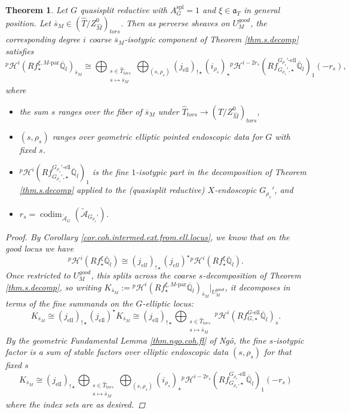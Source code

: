 \documentclass[openany]{amsbook}
\newtheorem{theorem}{Theorem}[chapter]
\theoremstyle{definition}
\theoremstyle{remark}
\numberwithin{equation}{section}
\newcommand{\Q}{\mathbb{Q}}
\newcommand{\cA}{\mathcal{A}}
\newcommand{\ol}[1]{\overline{#1}}
\renewcommand{\-}{\operatorname{-}}
\renewcommand{\a}{\mathfrak{a}}
\newcommand{\on}[1]{\operatorname{#1}}
\newcommand{\pHi}{{}^p \mathcal{H}^i}
\newcommand{\pHishift}{{}^p \mathcal{H}^{i - 2r_s}}
\newcommand{\good}{\mathit{good}}
\newcommand{\el}{\text{-ell}}
\newcommand{\ctA}{\widetilde{\cA}}
\newcommand{\spl}{\mathrm{spl}}
\newcommand{\Mpar}{M\text{-par}}
\newcommand{\tors}{\mathit{tors}}
\newcommand{\codim}{\on{codim}}
\begin{document}
\begin{theorem}\label{thm.coh.stab.geo}
    Let $G$ quasisplit reductive with $A_G^{\spl} = 1$ and $\xi \in \a_T$ in general position. Let $\ol{s}_M \in (\widehat{T}/Z^0_{\widehat{M}})_{\tors}$. Then as perverse sheaves on $U_M^{\good}$, the corresponding degree $i$ coarse $\ol{s}_M$-isotypic component of Theorem \ref{thm.s.decomp} satisfies
    $$
        \pHi(R f_\star^{\xi, \Mpar} \ol{\Q}_l)_{\ol{s}_M} \cong \bigoplus_{\substack{s \in \widehat{T}_{\tors} \\ s \mapsto \ol{s}_M}} \bigoplus_{(s, \rho_{s})} (j_{\on{ell}})_{!\star} (i_{\rho_{s}})_\star \pHishift(R f_{G_{\rho_s}',\star}^{G_{\rho_s}'\el} \ol{\Q}_l)_1(-r_s),
    $$
    where
    \begin{itemize} 
    \item the sum $s$ ranges over the fiber of $\ol{s}_M$ under $\widehat{T}_{\tors} \to (\widehat{T}/Z^0_{\widehat{M}})_{\tors}$,
    \item $(s,\rho_{s})$ ranges over geometric elliptic pointed endoscopic data for $G$ with fixed $s$.
    \item $\pHi(R f_{G_{\rho_s}',\star}^{G_{\rho_s}'\el} \ol{\Q}_l)_1$ is the fine $1$-isotypic part in the decomposition of Theorem \ref{thm.s.decomp} applied to the (quasisplit reductive) $X$-endoscopic $G_{\rho_s}'$, and
    \item $r_s = \codim_{\ctA_G}(\ctA_{G_{\rho_s}'})$.
    \end{itemize}
\begin{proof}
    By Corollary \ref{cor.coh.intermed.ext.from.ell.locus}, we know that on the good locus we have 
    $$
        \pHi(R f_\star^{\xi} \ol{\Q}_l) \cong (j_{ell})_{!\star} (j_{ell})^\star \pHi(R f_\star^{\xi} \ol{\Q}_l). 
    $$
    Once restricted to $U_M^{\good}$, this splits across the coarse $s$-decomposition of Theorem \ref{thm.s.decomp}, so writing $K_{\ol{s}_M} := \pHi(R f_\star^{\xi, \Mpar} \ol{\Q}_l)_{\ol{s}_M}|_{U_M^{\good}}$, it decomposes in terms of the \emph{fine} summands on the $G$-elliptic locus:
    $$
        K_{\ol{s}_M} \cong (j_{\on{ell}})_{!\star} (j_{\on{ell}})^\star K_{\ol{s}_M} \cong (j_{\on{ell}})_{!\star} \bigoplus_{\substack{s \in \widehat{T}_{\tors} \\ s \mapsto \ol{s}_M}} \pHi(R f^{G\el}_{G, \star} \ol{\Q}_l)_{s}.
    $$
    By the geometric Fundamental Lemma \ref{thm.ngo.coh.fl}  of Ng\^{o}, the fine $s$-isotypic factor is a sum of stable factors over elliptic endoscopic data $(s, \rho_{s})$ for that fixed $s$
    $$
        K_{\ol{s}_M} \cong (j_{\on{ell}})_{!\star} \bigoplus_{\substack{s \in \widehat{T}_{\tors} \\ s \mapsto \ol{s}_M}} \bigoplus_{(s, \rho_s)} (i_{\rho_{s}})_\star \pHishift(R f_{G_{\rho_s},\star}^{G_{\rho_s}\el} \ol{\Q}_l)_1(-r_s)
    $$
    where the index sets are as desired.
    

                    
                \end{proof}
\end{theorem}
\end{document}
